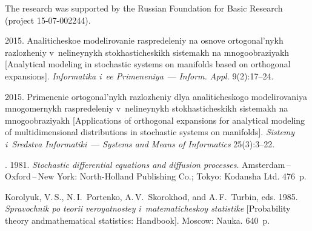 



\Ack
\noindent
The research was supported by the Russian Foundation for Basic Research 
(project 15-07-002244).




  \begin{multicols}{2}

\renewcommand{\bibname}{\protect\rmfamily References}



{\small\frenchspacing
 {%
 \begin{thebibliography}{99}


 2015.
Analiticheskoe modelirovanie raspredeleniy na osnove ortogonal'nykh 
razlozheniy v~neli\-ney\-nykh stokhasticheskikh sistemakh na mnogo\-ob\-ra\-zi\-yakh 
[Analytical modeling in stochastic systems on manifolds based on orthogonal expansions].
\textit{Informatika i~ee Primeneniya}~--- \textit{Inform. Appl.}  9(2):17--24.

 2015.
Primenenie ortogonal'nykh raz\-lo\-zhe\-niy dlya analiticheskogo modelirovaniya mnogomernykh 
raspredeleniy v~nelineynykh stokhasticheskikh sistemakh na mnogoobraziyakh [Applications 
of orthogonal expansions for analytical modeling of multidimensional distributions in 
stochastic systems on manifolds]. \textit{Sistemy i~Sredstva Informatiki}~---
\textit{Systems and Means of Informatics} 25(3):3--22.

. 1981. 
\textit{Stochastic differential equations and diffusion processes}. 
Amsterdam\,--\,Oxford\,--\,New York: North-Holland Publishing Co.; 
Tokyo: Kodansha Ltd. 476~p.

Korolyuk, V.\,S., N.\,I.~Portenko, A.\,V.~Skorokhod, and A.\,F.~Turbin, eds. 
1985.
\textit{Spravochnik po teorii veroyatnostey}
\textit{i~matematicheskoy statistike}
[Probability theory and\linebreak mathematical statistics: Handbook].
Moscow: Nauka. 640~p.



\end{thebibliography}}}
\end{multicols}
